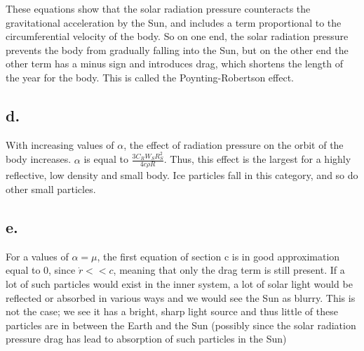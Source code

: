 These equations show that the solar radiation pressure counteracts the gravitational acceleration by the Sun, and includes a term proportional to the circumferential velocity of the body. So on one end, the solar radiation pressure prevents the body from gradually falling into the Sun, but on the other end the other term has a minus sign and introduces drag, which shortens the length of the year for the body. This is called the Poynting-Robertson effect.

\subsection*{d.}
With increasing values of $\alpha$, the effect of radiation pressure on the orbit of the body increases. $\alpha$ is equal to $\frac{3 C_R W_S R_S^2}{4 c \rho R}$. Thus, this effect is the largest for a highly reflective, low density and small body. Ice particles fall in this category, and so do other small particles.

\subsection*{e.}
For a values of $\alpha = \mu$, the first equation of section c is in good approximation equal to 0, since $\dot{r} << c$, meaning that only the drag term is still present. If a lot of such particles would exist in the inner system, a lot of solar light would be reflected or absorbed in various ways and we would see the Sun as blurry. This is not the case; we see it has a bright, sharp light source and thus little of these particles are in between the Earth and the Sun (possibly since the solar radiation pressure drag has lead to absorption of such particles in the Sun)




